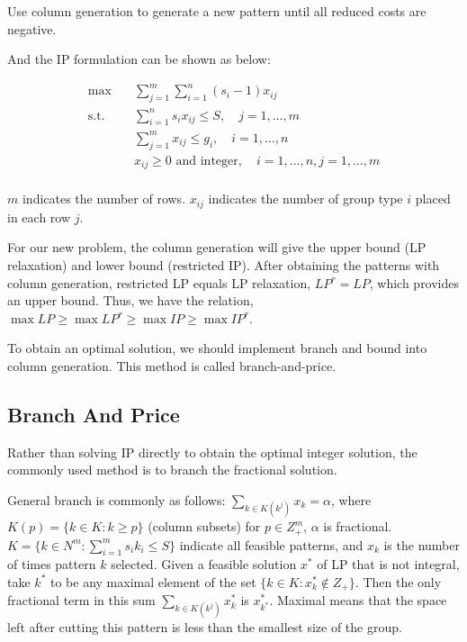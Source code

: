 Use column generation to generate a new pattern until all reduced costs are negative.

And the IP formulation can be shown as below:

\begin{equation}
\begin{aligned}
\mbox{max}\quad & \sum_{j=1}^{m} \sum_{i=1}^n (s_i-1) x_{ij} \\
\mbox{s.t.} \quad & \sum_{i=1}^n s_i x_{ij} \leq S, \quad j=1,\ldots,m \\
& \sum_{j=1}^{m} x_{ij} \leq g_i ,\quad i=1,\ldots,n \\
& x_{ij} \geq 0 \mbox{ and integer}, \quad i=1,\ldots,n, j=1,\ldots,m \\
\end{aligned}
\end{equation}

$m$ indicates the number of rows. $x_{ij}$ indicates the number of group type $i$ placed in each row $j$.

For our new problem, the column generation will give the upper bound (LP relaxation) and lower bound (restricted IP). After obtaining the patterns with column generation, restricted LP equals LP relaxation, $LP^r = LP$, which provides an upper bound. Thus, we have the relation, $\max LP \geq \max LP^r \geq \max IP \geq \max IP^r$.

To obtain an optimal solution, we should implement branch and bound into column generation. This method is called branch-and-price.

\subsection{Branch And Price}
Rather than solving IP directly to obtain the optimal integer solution, the commonly used method is to branch the fractional solution.

General branch is commonly as follows:
$\sum_{k \in K\left(k^{j}\right)} x_{k} = \alpha$, where $K(p) = \{k \in K: k\geq p\}$ (column subsets) for $p \in Z^m_+$, $\alpha$ is fractional.
$K = \{k \in N^m: \sum_{i=1}^m s_i k_i \leq S\}$ indicate all feasible patterns, and $x_k$ is the number of times pattern $k$ selected.
Given a feasible solution $x^*$ of LP that is not integral, take $k^*$ to be any maximal element of the set $\{k \in K: x_k^* \notin Z_+\}$. Then the only fractional term in this sum $\sum_{k \in K\left(k^{j}\right)} x_{k}^*$ is $x_{k^*}^*$.
Maximal means that the space left after cutting this pattern is less than the smallest size of the group.

